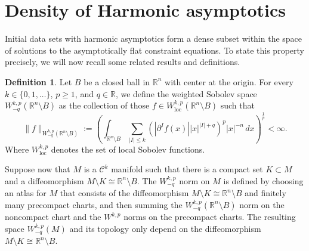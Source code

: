 \documentclass[12pt,a4paper]{amsart}
\theoremstyle{plain}
\theoremstyle{definition}
\newtheorem{definition}[theorem]{Definition}
\begin{document}
 \appendix

\section{Density of Harmonic asymptotics}\label{appendix}

 Initial data sets with harmonic asymptotics form a dense subset within the space of solutions to the asymptotically flat constraint equations. To state this property precisely, we will now recall some related results and definitions. 
\begin{definition}
    Let $B$ be a closed ball in $\mathbb{R}^n$ with center at the origin. For every $k \in \{0, 1, \dots\}$, $p \geq 1$, and $q \in \mathbb{R}$, we define the weighted Sobolev space $W^{k,p}_{-q}(\mathbb{R}^n \setminus B)$ as the collection of those $f \in W^{k,p}_{\text{loc}}(\mathbb{R}^n \setminus B)$ such that
\[
\| f \|_{W^{k,p}_{-q}(\mathbb{R}^n \setminus B)} :=
\left(
\int_{\mathbb{R}^n \setminus B}
\sum_{|I| \leq k}
\left( |\partial^I f(x)| |x|^{|I|+q} \right)^p |x|^{-n} \, dx
\right)^{\frac{1}{p}}
< \infty.
\]
Where $ W^{k,p}_{\text{loc}} $ denotes the set of local Sobolev functions.
\end{definition}
Suppose now that $M$ is a $\mathcal{C}^k$ manifold such that there is a compact set $K \subset M$ and a diffeomorphism $M \setminus K \cong \mathbb{R}^n \setminus B$. The $W^{k,p}_{-q}$ norm on $M$ is defined by choosing an atlas for $M$ that consists of the diffeomorphism $M \setminus K \cong \mathbb{R}^n \setminus B$ and finitely many precompact charts, and then summing the $W^{k,p}_{-q}(\mathbb{R}^n \setminus B)$ norm on the noncompact chart and the $W^{k,p}$ norms on the precompact charts. The resulting space $W^{k,p}_{-q}(M)$ and its topology only depend on the diffeomorphism $M \setminus K \cong \mathbb{R}^n \setminus B$.
\end{document}

